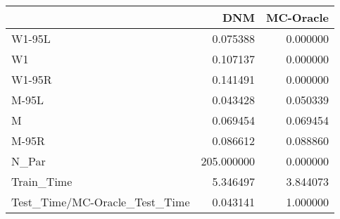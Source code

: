 \begin{tabular}{lrr}
\toprule
{} &         DNM &  MC-Oracle \\
\midrule
W1-95L                        &    0.075388 &   0.000000 \\
W1                            &    0.107137 &   0.000000 \\
W1-95R                        &    0.141491 &   0.000000 \\
M-95L                         &    0.043428 &   0.050339 \\
M                             &    0.069454 &   0.069454 \\
M-95R                         &    0.086612 &   0.088860 \\
N\_Par                         &  205.000000 &   0.000000 \\
Train\_Time                    &    5.346497 &   3.844073 \\
Test\_Time/MC-Oracle\_Test\_Time &    0.043141 &   1.000000 \\
\bottomrule
\end{tabular}
